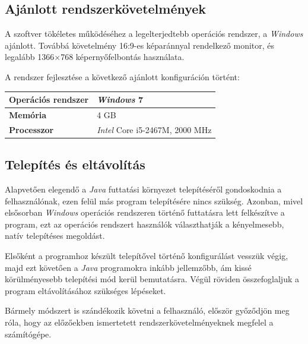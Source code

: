 \documentclass{elteikthesis}
\begin{document}
\subsection{Ajánlott rendszerkövetelmények}
A szoftver tökéletes működéséhez a legelterjedtebb operációs rendszer, a \emph{Windows} ajánlott. Továbbá követelmény 16:9-es képaránnyal rendelkező monitor, és legalább 1366$\times$768 képernyőfelbontás használata.\par
A rendszer fejlesztése a következő ajánlott konfiguráción történt:
\begin{table}[h]
	\def\arraystretch{2}
	\centering
	\begin{tabular}{|l|l|}
		\hline
		\textbf{Operációs rendszer} & \emph{Windows} 7                     \\ \hline
		\textbf{Memória}            & 4 GB                          \\ \hline
		\textbf{Processzor}         & \emph{Intel} Core i5-2467M, 2000 MHz \\ \hline
	\end{tabular}
\end{table}

\subsection{Telepítés és eltávolítás}
Alapvetően elegendő a \emph{Java} futtatási környezet telepítéséről gondoskodnia a felhasználónak, ezen felül más program telepítésére nincs szükség. Azonban, mivel elsősorban \emph{Windows} operációs rendszeren történő futtatásra lett felkészítve a program, ezt az operációs rendszert használók választhatják a kényelmesebb, natív telepítéses megoldást.\par
Elsőként a programhoz készült telepítővel történő konfigurálást vesszük végig, majd ezt követően a \emph{Java} programokra inkább jellemzőbb, ám kissé körülményesebb telepítési mód kerül bemutatásra. Végül röviden összefoglaljuk a program eltávolításához szükséges lépéseket.
\par Bármely módszert is szándékozik követni a felhasználó, először győződjön meg róla, hogy az előzőekben ismertetett rendszerkövetelményeknek megfelel a számítógépe.
\end{document}
